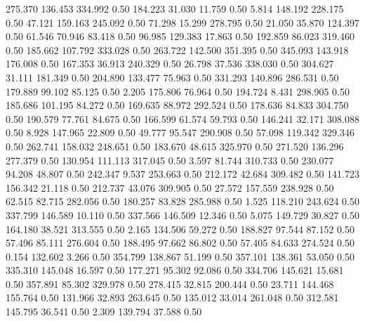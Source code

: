  275.370  136.453  334.992         0.50
 184.223   31.030   11.759         0.50
   5.814  148.192  228.175         0.50
  47.121  159.163  245.092         0.50
  71.298   15.299  278.795         0.50
  21.050   35.870  124.397         0.50
  61.546   70.946   83.418         0.50
  96.985  129.383   17.863         0.50
 192.859   86.023  319.460         0.50
 185.662  107.792  333.028         0.50
 263.722  142.500  351.395         0.50
 345.093  143.918  176.008         0.50
 167.353   36.913  240.329         0.50
  26.798   37.536  338.030         0.50
 304.627   31.111  181.349         0.50
 204.890  133.477   75.963         0.50
 331.293  140.896  286.531         0.50
 179.889   99.102   85.125         0.50
   2.205  175.806   76.964         0.50
 194.724    8.431  298.905         0.50
 185.686  101.195   84.272         0.50
 169.635   88.972  292.524         0.50
 178.636   84.833  304.750         0.50
 190.579   77.761   84.675         0.50
 166.599   61.574   59.793         0.50
 146.241   32.171  308.088         0.50
   8.928  147.965   22.809         0.50
  49.777   95.547  290.908         0.50
  57.098  119.342  329.346         0.50
 262.741  158.032  248.651         0.50
 183.670   48.615  325.970         0.50
 271.520  136.296  277.379         0.50
 130.954  111.113  317.045         0.50
   3.597   81.744  310.733         0.50
 230.077   94.208   48.807         0.50
 242.347    9.537  253.663         0.50
 212.172   42.684  309.482         0.50
 141.723  156.342   21.118         0.50
 212.737   43.076  309.905         0.50
  27.572  157.559  238.928         0.50
  62.515   82.715  282.056         0.50
 180.257   83.828  285.988         0.50
   1.525  118.210  243.624         0.50
 337.799  146.589   10.110         0.50
 337.566  146.509   12.346         0.50
   5.075  149.729   30.827         0.50
 164.180   38.521  313.555         0.50
   2.165  134.506   59.272         0.50
 188.827   97.544   87.152         0.50
  57.496   85.111  276.604         0.50
 188.495   97.662   86.802         0.50
  57.405   84.633  274.524         0.50
   0.154  132.602    3.266         0.50
 354.799  138.867   51.199         0.50
 357.101  138.361   53.050         0.50
 335.310  145.048   16.597         0.50
 177.271   95.302   92.086         0.50
 334.706  145.621   15.681         0.50
 357.891   85.302  329.978         0.50
 278.415   32.815  200.444         0.50
  23.711  144.468  155.764         0.50
 131.966   32.893  263.645         0.50
 135.012   33.014  261.048         0.50
 312.581  145.795   36.541         0.50
   2.309  139.794   37.588         0.50
